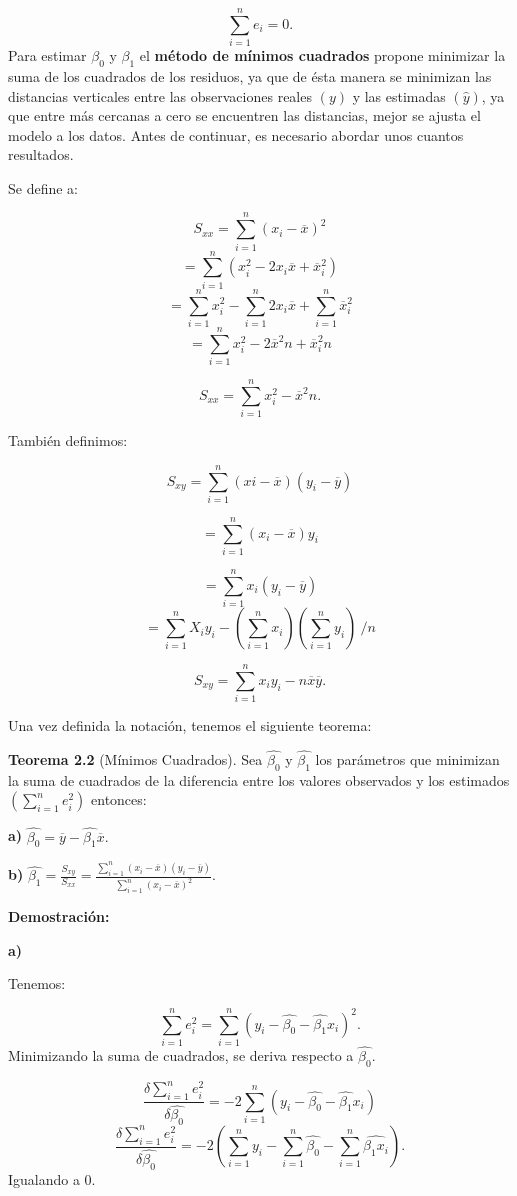 \documentclass[
  a4paper,
  oneside,
  openany]{book}
\begin{document}
\[\sum_{i=1}^{n}e_{i}=0.\]
Para estimar \(\beta_{0}\) y \(\beta_{1}\) el \textbf{método de mínimos cuadrados} propone minimizar la suma de los cuadrados de los residuos, ya que de ésta manera se minimizan las distancias verticales entre las observaciones reales \((y)\) y las estimadas \((\hat{y})\), ya que entre más cercanas a cero se encuentren las distancias, mejor se ajusta el modelo a los datos.
Antes de continuar, es necesario abordar unos cuantos resultados.

Se define a:

\[S_{xx}=\sum_{i=1}^{n}(x_{i}-\overline{x})^{2}\]
\[=\sum_{i=1}^{n}(x_{i}^2-2x_{i}\overline{x}+\overline{x}_{i}^{2})\]
\[=\sum_{i=1}^{n}x_{i}^{2}-\sum_{i=1}^{n}2x_{i}\overline{x}+\sum_{i=1}^{n}\overline{x}_{i}^2\]
\[=\sum_{i=1}^{n}x_{i}^2-2\overline{x}^2n+\overline{x}_{i}^2n\]

\[S_{xx}=\sum_{i=1}^{n}x_{i}^2-\overline{x}^2n.\]

También definimos:

\[S_{xy}=\sum_{i=1}^{n}(xi-\overline{x})(y_{i}-\overline{y})\]

\[=\sum_{i=1}^{n}(x_{i}-\overline{x})y_{i}\]

\[=\sum_{i=1}^{n}x_{i}(y_{i}-\overline{y})\]
\[=\sum_{i=1}^{n}X_{i}y_{i}-\left(\sum_{i=1}^{n}x_{i}\right) \left(\sum_{i=1}^{n}y_{i}\right) \ /{n}\]

\[S_{xy}=\sum_{i=1}^{n}x_{i}y_{i}-n\overline{x}\overline{y}.\]

Una vez definida la notación, tenemos el siguiente teorema:

\textbf{Teorema 2.2} (Mínimos Cuadrados). Sea \(\hat{\beta_0}\) y \(\hat{\beta_{1}}\) los parámetros que minimizan la suma de cuadrados de la diferencia entre los valores observados y los estimados \(\left(\sum_{i=1}^{n}e_i^2\right)\) entonces:

\textbf{a)} \(\hat{\beta_{0}}=\overline{y}-\hat{\beta_{1}}\overline{x}.\)

\textbf{b)} \(\hat{\beta_{1}}=\frac{S_{xy}}{S_{xx}}=\frac{\sum_{i=1}^{n}(x_{i}-\overline{x})(y_{i}-\overline{y})}{\sum_{i=1}^{n}(x_{i}-\overline{x})^2}.\)

\textbf{Demostración:}

\textbf{a)}

Tenemos:

\[\sum_{i=1}^{n}e_{i}^2=\sum_{i=1}^{n}(y_{i}-\hat{\beta_{0}}-\hat{\beta_{1}}x_{i})^2.\]
Minimizando la suma de cuadrados, se deriva respecto a \(\hat{\beta_{0}}.\)

\[\frac{\delta\sum_{i=1}^{n}e_{i}^2}{\delta\hat{\beta_{0}}}=-2\sum_{i=1}^{n}(y_{i}-\hat{\beta_{0}}-\hat{\beta_{1}}x_{i})\]
\[\frac{\delta\sum_{i=1}^{n}e_{i}^2}{\delta\hat{\beta_{0}}}=-2\left(\sum_{i=1}^{n}y_{i}-\sum_{i=1}^{n}\hat{\beta_{0}}-\sum_{i=1}^{n}\hat{\beta_{1}x_{i}}\right).\]
Igualando a 0.
\end{document}
